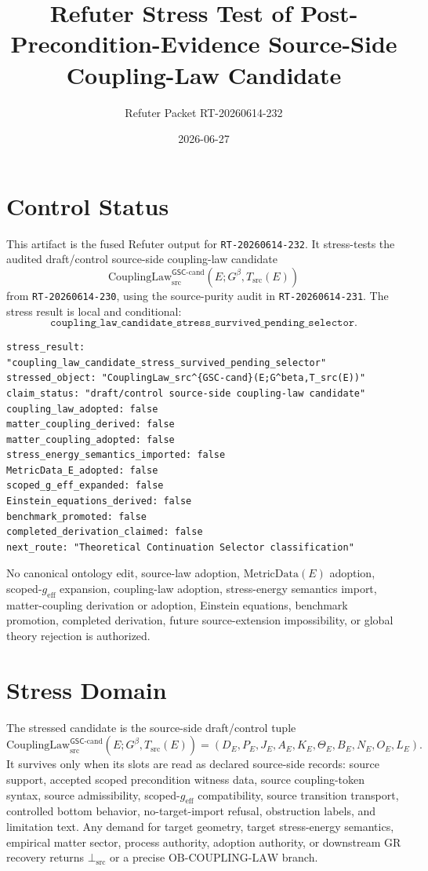\documentclass[11pt]{article}
\title{Refuter Stress Test of Post-Precondition-Evidence Source-Side Coupling-Law Candidate}
\author{Refuter Packet RT-20260614-232}
\date{2026-06-27}
\newcommand{\Gbeta}{G^\beta}
\newcommand{\geff}{g_{\mathrm{eff}}}
\newcommand{\CouplingLaw}{\mathrm{CouplingLaw}^{\mathsf{GSC}\mbox{-}\mathrm{cand}}_{\mathrm{src}}}
\newcommand{\MetricData}{\mathrm{MetricData}}
\newcommand{\BottomSrc}{\bot_{\mathrm{src}}}
\newcommand{\OBCouplingLaw}{\mathrm{OB}\mbox{-}\mathrm{COUPLING}\mbox{-}\mathrm{LAW}}
\begin{document}
\maketitle

\section{Control Status}

This artifact is the fused Refuter output for \texttt{RT-20260614-232}. It
stress-tests the audited draft/control source-side coupling-law candidate
\[
  \CouplingLaw(E;\Gbeta,T_{\mathrm{src}}(E))
\]
from \texttt{RT-20260614-230}, using the source-purity audit in
\texttt{RT-20260614-231}. The stress result is local and conditional:
\[
  \texttt{coupling\_law\_candidate\_stress\_survived\_pending\_selector}.
\]

\begin{verbatim}
stress_result: "coupling_law_candidate_stress_survived_pending_selector"
stressed_object: "CouplingLaw_src^{GSC-cand}(E;G^beta,T_src(E))"
claim_status: "draft/control source-side coupling-law candidate"
coupling_law_adopted: false
matter_coupling_derived: false
matter_coupling_adopted: false
stress_energy_semantics_imported: false
MetricData_E_adopted: false
scoped_g_eff_expanded: false
Einstein_equations_derived: false
benchmark_promoted: false
completed_derivation_claimed: false
next_route: "Theoretical Continuation Selector classification"
\end{verbatim}

No canonical ontology edit, source-law adoption, \(\MetricData(E)\)
adoption, scoped-\(\geff\) expansion, coupling-law adoption, stress-energy
semantics import, matter-coupling derivation or adoption, Einstein equations,
benchmark promotion, completed derivation, future source-extension
impossibility, or global theory rejection is authorized.

\section{Stress Domain}

The stressed candidate is the source-side draft/control tuple
\[
  \CouplingLaw(E;\Gbeta,T_{\mathrm{src}}(E)) =
  (D_E,P_E,J_E,A_E,K_E,\Theta_E,B_E,N_E,O_E,L_E).
\]
It survives only when its slots are read as declared source-side records:
source support, accepted scoped precondition witness data, source
coupling-token syntax, source admissibility, scoped-\(\geff\) compatibility,
source transition transport, controlled bottom behavior, no-target-import
refusal, obstruction labels, and limitation text. Any demand for target
geometry, target stress-energy semantics, empirical matter sector, process
authority, adoption authority, or downstream GR recovery returns \(\BottomSrc\)
or a precise \(\OBCouplingLaw\) branch.
\end{document}
